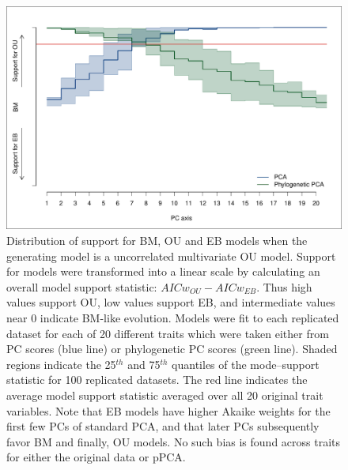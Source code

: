 \documentclass[a4paper,12pt]{article}
\begin{document}
\begin{figure}[p]
\centering
\includegraphics[scale=0.65]{./fig/uncor-ou-aic.pdf}
\caption{Distribution of support for BM, OU and EB models when the generating model is a uncorrelated multivariate OU model. Support for models were transformed into a linear scale by calculating an overall model support statistic: $AICw_{OU} - AICw_{EB}$. Thus high values support OU, low values support EB, and intermediate values near 0 indicate BM-like evolution. Models were fit to each replicated dataset for each of 20 different traits which were taken either from PC scores (blue line) or phylogenetic PC scores (green line). Shaded regions indicate the 25$^{th}$ and 75$^{th}$ quantiles of the mode--support statistic for  100 replicated datasets. The red  line indicates the average model support statistic averaged over all 20 original trait variables. Note that EB models have higher Akaike weights for the first few PCs of standard PCA, and that later PCs subsequently favor BM and finally, OU models. No such bias is found across traits for either the original data or pPCA.}
\label{oufit}
\end{figure}
\end{document}
